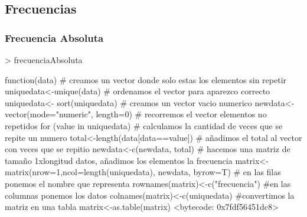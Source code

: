 \documentclass [a4paper] {article}
\begin{document}
\subsection{Frecuencias}
\subsubsection{Frecuencia Absoluta}
\begin{Schunk}
\begin{Sinput}
> frecuenciaAbsoluta
\end{Sinput}
\begin{Soutput}
function(data){
  # creamos un vector donde solo estas los elementos sin repetir
  uniquedata<-unique(data)
  # ordenamos el vector para aparezco correcto 
  uniquedata<- sort(uniquedata)
  # creamos un vector vacio numerico
  newdata<- vector(mode="numeric", length=0)
  # recorremos el vector elementos no repetidos  
  for (value in uniquedata) {
    # calculamos la cantidad de veces que se repite un numero
    total<-length(data[data==value])
    # añadimos el total al vector con veces que se repitio
    newdata<-c(newdata, total)
  }
  # hacemos una matriz de tamaño 1xlongitud datos, añadimos los elementos la frecuencia
  matrix<-matrix(nrow=1,ncol=length(uniquedata), newdata, byrow=T)
  # en las filas ponemos el nombre que representa
  rownames(matrix)<-c("frecuencia")
  #en las columnas ponemos los datos
  colnames(matrix)<-c(uniquedata)
  #convertimos la matriz en una tabla
  matrix<-as.table(matrix)
}
<bytecode: 0x7fdf56451dc8>
\end{Soutput}
\end{Schunk}
\end{document}
